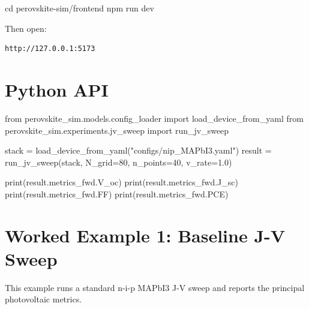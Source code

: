 \documentclass[
  11pt,
  american,
]{report}
\newenvironment{Shaded}{}{}
\newcommand{\BuiltInTok}[1]{#1}
\newcommand{\DecValTok}[1]{\textcolor[rgb]{0.25,0.63,0.44}{#1}}
\newcommand{\ExtensionTok}[1]{#1}
\newcommand{\FloatTok}[1]{\textcolor[rgb]{0.25,0.63,0.44}{#1}}
\newcommand{\ImportTok}[1]{#1}
\newcommand{\NormalTok}[1]{#1}
\newcommand{\OperatorTok}[1]{\textcolor[rgb]{0.40,0.40,0.40}{#1}}
\newcommand{\StringTok}[1]{\textcolor[rgb]{0.25,0.44,0.63}{#1}}
\begin{document}
\begin{Shaded}
\begin{Highlighting}[]
\BuiltInTok{cd}\NormalTok{ perovskite{-}sim/frontend}
\ExtensionTok{npm}\NormalTok{ run dev}
\end{Highlighting}
\end{Shaded}

Then open:

\begin{verbatim}
http://127.0.0.1:5173
\end{verbatim}

\hypertarget{python-api}{%
\section{Python API}\label{python-api}}

\begin{Shaded}
\begin{Highlighting}[]
\ImportTok{from}\NormalTok{ perovskite\_sim.models.config\_loader }\ImportTok{import}\NormalTok{ load\_device\_from\_yaml}
\ImportTok{from}\NormalTok{ perovskite\_sim.experiments.jv\_sweep }\ImportTok{import}\NormalTok{ run\_jv\_sweep}

\NormalTok{stack }\OperatorTok{=}\NormalTok{ load\_device\_from\_yaml(}\StringTok{"configs/nip\_MAPbI3.yaml"}\NormalTok{)}
\NormalTok{result }\OperatorTok{=}\NormalTok{ run\_jv\_sweep(stack, N\_grid}\OperatorTok{=}\DecValTok{80}\NormalTok{, n\_points}\OperatorTok{=}\DecValTok{40}\NormalTok{, v\_rate}\OperatorTok{=}\FloatTok{1.0}\NormalTok{)}

\BuiltInTok{print}\NormalTok{(result.metrics\_fwd.V\_oc)}
\BuiltInTok{print}\NormalTok{(result.metrics\_fwd.J\_sc)}
\BuiltInTok{print}\NormalTok{(result.metrics\_fwd.FF)}
\BuiltInTok{print}\NormalTok{(result.metrics\_fwd.PCE)}
\end{Highlighting}
\end{Shaded}

\hypertarget{worked-example-1-baseline-j-v-sweep}{%
\section{Worked Example 1: Baseline J-V
Sweep}\label{worked-example-1-baseline-j-v-sweep}}

This example runs a standard n-i-p MAPbI3 J-V sweep and reports the
principal photovoltaic metrics.
\end{document}

